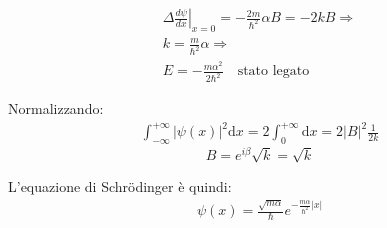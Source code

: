 \begin{equation}\begin{split}
\left. \Delta \frac{d\psi }{dx}\right|_{x=0}=-\frac{2m}{\hbar ^2}\alpha B=-2kB \Longrightarrow \\
k=\frac{m}{\hbar ^2}\alpha \Longrightarrow \\
E=-\frac{m\alpha ^2}{2\hbar ^2} \quad \textrm{stato legato}
\end{split}\end{equation}

Normalizzando:
\begin{equation}\begin{split}
\int_{-\infty }^{+\infty }{|\psi \left(x\right)|^2 \textrm{d}x}=2\int_{0}^{+\infty }{ \textrm{d}x}=2|B|^2\frac{1}{2k}
\end{split}\end{equation}
\begin{equation}
B=e^{i\beta}\sqrt{k}=\sqrt{k}
\end{equation}

L'equazione di Schrödinger è quindi:
\begin{equation}\begin{split}
\psi \left(x\right)=\frac{\sqrt{m\alpha}}{\hbar }e^{-\frac{m\alpha}{\hbar ^2}|x|}
\end{split}\end{equation}